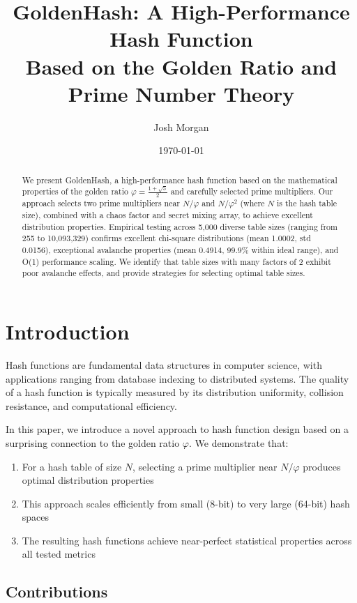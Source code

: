 \documentclass[11pt,a4paper]{article}
\title{GoldenHash: A High-Performance Hash Function\\
\large Based on the Golden Ratio and Prime Number Theory}
\author{
Josh Morgan
}
\date{\today}
\theoremstyle{definition}
\begin{document}
\maketitle

\begin{abstract}
We present GoldenHash, a high-performance hash function based on the mathematical properties of the golden ratio $\varphi = \frac{1 + \sqrt{5}}{2}$ and carefully selected prime multipliers. 
Our approach selects two prime multipliers near $N/\varphi$ and $N/\varphi^2$ (where $N$ is the hash table size), combined with a chaos factor and secret mixing array, to achieve excellent distribution properties.
Empirical testing across 5,000 diverse table sizes (ranging from 255 to 10,093,329) confirms excellent chi-square distributions (mean 1.0002, std 0.0156), exceptional avalanche properties (mean 0.4914, 99.9\% within ideal range), and O(1) performance scaling.
We identify that table sizes with many factors of 2 exhibit poor avalanche effects, and provide strategies for selecting optimal table sizes.
\end{abstract}

\section{Introduction}

Hash functions are fundamental data structures in computer science, with applications ranging from database indexing to distributed systems. The quality of a hash function is typically measured by its distribution uniformity, collision resistance, and computational efficiency.

In this paper, we introduce a novel approach to hash function design based on a surprising connection to the golden ratio $\varphi$. We demonstrate that:

\begin{enumerate}
\item For a hash table of size $N$, selecting a prime multiplier near $N/\varphi$ produces optimal distribution properties
\item This approach scales efficiently from small (8-bit) to very large (64-bit) hash spaces
\item The resulting hash functions achieve near-perfect statistical properties across all tested metrics
\end{enumerate}

\subsection{Contributions}
\end{document}
